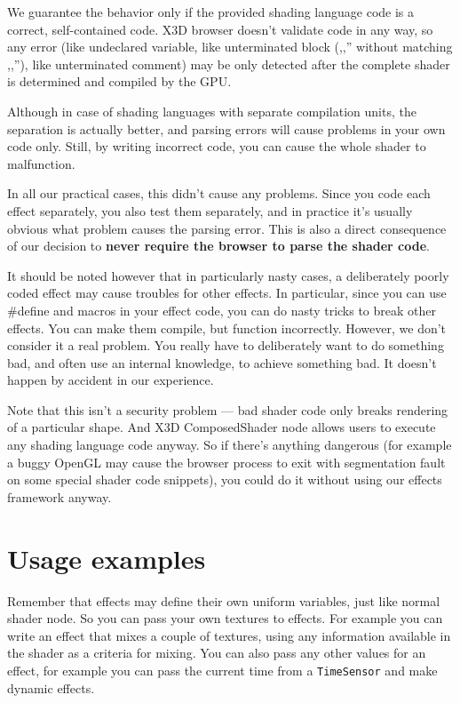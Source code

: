\documentclass{acmsiggraph}                     %
\begin{document}
We guarantee the behavior only if the provided shading language code
is a correct, self-contained code.
X3D browser doesn't validate code in any way, so any error (like undeclared
variable, like unterminated block (,,{'' without matching ,,}''),
like unterminated comment) may be only detected after the complete shader
is determined and compiled by the GPU.

Although in case of shading languages with separate compilation units,
the separation is actually better, and parsing errors will cause
problems in your own code only. Still, by writing incorrect code,
you can cause the whole shader to malfunction.

In all our practical cases, this didn't cause any problems.
Since you code each effect separately, you also test them separately,
and in practice it's usually obvious what problem causes the parsing error.
This is also a direct consequence of our decision to \textbf{never require
the browser to parse the shader code}.

It should be noted however that in particularly nasty cases,
a deliberately poorly coded effect may cause troubles for other effects.
In particular, since you can use \#define and macros in your effect code,
you can do nasty tricks to break other effects. You can make them compile,
but function incorrectly. However, we don't consider
it a real problem. You really have to deliberately want to do something bad,
and often use an internal knowledge, to achieve something bad.
It doesn't happen by accident in our experience.

Note that this isn't a security problem --- bad shader code only breaks
rendering of a particular shape. And X3D ComposedShader node allows users
to execute any shading language code anyway. So if there's anything dangerous
(for example a buggy OpenGL may cause the browser process to exit with
segmentation fault on some special shader code snippets),
you could do it without using our effects framework anyway.

\section{Usage examples}

Remember that effects may define their own uniform variables,
just like normal shader node. So you can pass your own textures
to effects. For example you can write an effect that mixes a couple of textures,
using any information available in the shader as a criteria for mixing.
You can also pass any other values for an effect, for example you can
pass the current time from a \texttt{TimeSensor} and make dynamic effects.
\end{document}

